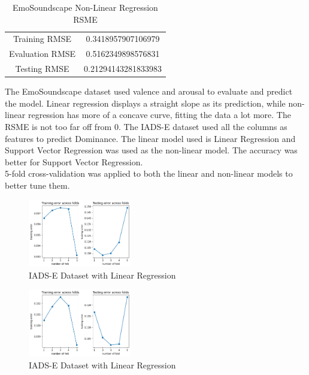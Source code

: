 \documentclass[conference]{IEEEtran}
\begin{document}
{\begin{table}[h]
\caption{EmoSoundscape Non-Linear Regression RSME}
\begin{center}
\begin{tabular}{ |c|c| } 
 \hline
 Training RMSE & 0.3418957907106979 \\
 Evaluation RMSE & 0.5162349898576831 \\
 Testing RMSE & 0.21294143281833983 \\
 \hline
\end{tabular}
\end{center}
\label{tab:myTab}
\end{table}

\FloatBarrier


The EmoSoundscape dataset used valence and arousal to evaluate and predict the model. Linear regression displays a straight slope as its prediction, while non-linear regression has more of a concave curve, fitting the data a lot more. The RSME is not too far off from 0. The IADS-E dataset used all the columns as features to predict Dominance. The linear model used is Linear Regression and Support Vector Regression was used as the non-linear model. The accuracy was better for Support Vector Regression.\\

5-fold cross-validation was applied to both the linear and non-linear models to better tune them. 
\FloatBarrier

\begin{figure}[h]
\caption{IADS-E Dataset with Linear Regression}
\centering
\includegraphics[width=0.4\textwidth]{Figures/5FoldLR.png}
\end{figure}

\FloatBarrier

\begin{figure}[h]
\caption{IADS-E Dataset with Linear Regression}
\centering
\includegraphics[width=0.4\textwidth]{Figures/5FoldErrorGraph.png}
\end{figure}

}
\end{document}

